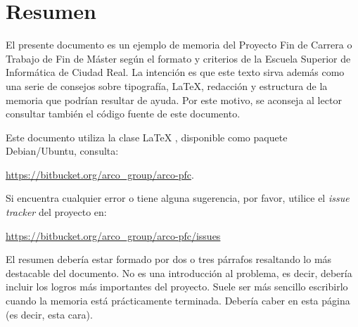 \chapter{Resumen}

El presente documento es un ejemplo de memoria del Proyecto Fin de Carrera o Trabajo de
Fin de Máster según el formato y criterios de la Escuela Superior de Informática de Ciudad
Real. La intención es que este texto sirva además como una serie de consejos sobre
tipografía, \LaTeX, redacción y estructura de la memoria que podrían resultar de
ayuda. Por este motivo, se aconseja al lector consultar también el código fuente de este
documento.

Este documento utiliza la clase \LaTeX{} \arcopfc{}, disponible como paquete
Debian/Ubuntu, consulta:

 \url{https://bitbucket.org/arco_group/arco-pfc}.

Si encuentra cualquier error o tiene alguna sugerencia, por favor, utilice
el \emph{issue tracker} del proyecto \arcopfc{} en:

\url{https://bitbucket.org/arco_group/arco-pfc/issues}

El resumen debería estar formado por dos o tres párrafos resaltando lo más
destacable del documento. No es una introducción al problema, es decir, debería
incluir los logros más importantes del proyecto. Suele ser más sencillo
escribirlo cuando la memoria está prácticamente terminada. Debería caber en esta
página (es decir, esta cara).
